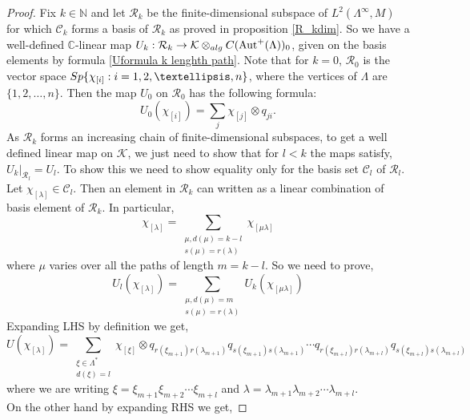\documentclass{amsart}
\theoremstyle{plain}
\theoremstyle{definition}
\theoremstyle{remark}
\numberwithin{equation}{section}
\newcommand{\cal}{\mathcal}
\newcommand{\clr}{{\cal R}}
\newcommand{\raro}{\rightarrow}
\begin{document}
\begin{proof}
    Fix $k\in \mathbb{N}$ and let $\mathcal{R}_{k}$ be the finite-dimensional subspace of $L^2(\Lambda^{\infty},M)$ for which $\mathcal{C}_{k}$ forms a basis of $\mathcal{R}_{k}$ as proved in proposition \ref{R_kdim}. So we have a well-defined $\mathbb{C}$-linear map $U_{k}:\mathcal{R}_{k}\raro \mathcal{K}\otimes_{{\rm alg}}C(\text{Aut}^{+}(\Lambda))_{0}$, given on the basis elements by formula \ref{Uformula k lenghth path}.  
  Note that for $k=0$, $\clr_{0}$ is the vector space ${\rm Sp}\{\chi_{[i]}:i=1,2,\ldots,n\}$, where the vertices of $\Lambda$ are $\{1,2,\ldots,n\}$. Then the map $U_{0}$ on $\clr_{0}$ has the following formula:
\begin{equation}
    \label{Uformula vertices}
    U_{0}(\chi_{[i]})=\sum\limits_{j}\chi_{[j]}\otimes q_{ji}.
\end{equation}
As $\mathcal{R}_{k}$ forms an increasing chain of finite-dimensional subspaces, to get a well defined linear map on $\mathcal{K}$, we just need to show that for $l<k$ the maps satisfy, $U_{k}|_{\mathcal{R}_{l}}=U_{l}$. To show this we need to show equality only for the basis set $\mathcal{C}_{l}$ of $\clr_{l}$. Let $\chi_{[\lambda]}\in \mathcal{C}_{l}$. Then an element in $\mathcal{R}_{k}$ can written as a linear combination of basis element of $\mathcal{R}_{k}$. In particular, 
\begin{equation*}
\chi_{[\lambda]}=\sum\limits_{\substack{\mu,d(\mu)=k-l\\ s(\mu)=r(\lambda)}}\chi_{[\mu\lambda]}
\end{equation*}
where $\mu$ varies over all the paths of length $m=k-l$. So we need to prove, 
\begin{equation*}
    U_{l}(\chi_{[\lambda]})=\sum\limits_{\substack{\mu,d(\mu)=m\\ s(\mu)=r(\lambda)}}U_{k}(\chi_{[\mu\lambda]})
\end{equation*}
Expanding LHS by definition we get, 
\begin{equation*}
U(\chi_{[\lambda]})=\sum\limits_{\substack{\xi\in \Lambda^{*}\\
d(\xi)=l}}\chi_{[\xi]}\otimes q_{r(\xi_{m+1})r(\lambda_{m+1})}q_{s(\xi_{m+1})s(\lambda_{m+1})}\cdots q_{r(\xi_{m+l})r(\lambda_{m+l})}q_{s(\xi_{m+l})s(\lambda_{m+l})}
\end{equation*}
where we are writing $\xi=\xi_{m+1}\xi_{m+2}\cdots\xi_{m+l}$ and $\lambda=\lambda_{m+1}\lambda_{m+2}\cdots\lambda_{m+l}$.\\
On the other hand by expanding RHS we get, 

\end{proof}
\end{document}
